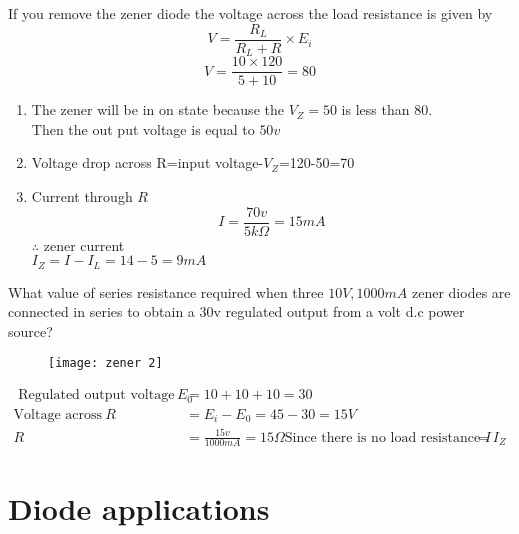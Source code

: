 \begin{answer}
If you remove the zener diode the  voltage across the load resistance is given by
$$V=\frac{R_L}{R_L+R}\times E_i$$
$$V=\frac{10 \times 120}{5+10}=80$$
\begin{enumerate}
	\item The zener will be in on state because the $V_Z=50$ is less than 80.\\
	Then the out put voltage is equal to $50v$\\
	\item Voltage drop across R=input voltage-$V_Z$=120-50=70\\
	\item Current through $R$ \\
	$$I=\frac{70v}{5k\Omega}=15mA$$
	$\therefore$ zener current \\
	$I_Z=I-I_L=14-5=9mA$
\end{enumerate}

\end{answer}
\begin{exercise}
What value of series resistance required when three $10V,1000mA$ zener diodes are connected in series to obtain a 30v regulated output from a volt d.c power source?\\
\begin{figure}[H]
	\centering
	\texttt{[image: zener 2]}
	
\end{figure}
\end{exercise}
\begin{answer}
	\begin{align*}
\text{	Regulated output voltage} \ E_0&=10+10+10=30\\
	\text{Voltage across}\ R&=E_i-E_0=45-30=15V\\
	R&=\frac{15v}{1000mA}=15\Omega
	\text{Since there is no load resistance } I&=I_Z
	\end{align*}

\end{answer}
\section{Diode applications}
